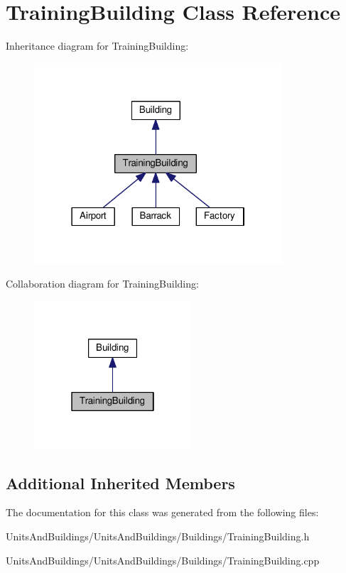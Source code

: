 \hypertarget{class_training_building}{}\section{Training\+Building Class Reference}
\label{class_training_building}


Inheritance diagram for Training\+Building\+:
\nopagebreak
\begin{figure}[H]
\begin{center}
\leavevmode
\includegraphics[width=262pt]{class_training_building__inherit__graph}
\end{center}
\end{figure}


Collaboration diagram for Training\+Building\+:
\nopagebreak
\begin{figure}[H]
\begin{center}
\leavevmode
\includegraphics[width=166pt]{class_training_building__coll__graph}
\end{center}
\end{figure}
\subsection*{Additional Inherited Members}


The documentation for this class was generated from the following files\+:\begin{DoxyCompactItemize}
\item 
Units\+And\+Buildings/\+Units\+And\+Buildings/\+Buildings/Training\+Building.\+h\item 
Units\+And\+Buildings/\+Units\+And\+Buildings/\+Buildings/Training\+Building.\+cpp\end{DoxyCompactItemize}
